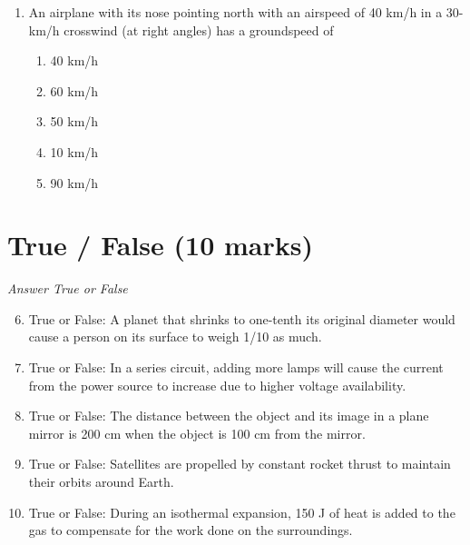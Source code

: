\documentclass[12pt]{article}
\begin{document}
\begin{enumerate}[label=\arabic*.]
\begin{enumerate}[label=(\alph*)]
    \item $97 \mu \mathrm{C}$
    \item $37$$\mu \mathrm{C}$
    \item $77 \mu \mathrm{C}$
    \item $87 \mu \mathrm{C}$
    \item $17 \mu \mathrm{C}$
\end{enumerate}
\item An airplane with its nose pointing north with an airspeed of 40 km/h in a 30-km/h crosswind (at right angles) has a groundspeed of
\begin{enumerate}[label=(\alph*)]
    \item 40 km/h
    \item 60 km/h
    \item 50 km/h
    \item 10 km/h
    \item 90 km/h
\end{enumerate}
\end{enumerate}

\section*{True / False (10 marks)}
\textit{Answer True or False}
\begin{enumerate}[label=\arabic*.]
\setcounter{enumi}{5}
\item True or False: A planet that shrinks to one-tenth its original diameter would cause a person on its surface to weigh 1/10 as much.
\item True or False: In a series circuit, adding more lamps will cause the current from the power source to increase due to higher voltage availability.
\item True or False: The distance between the object and its image in a plane mirror is 200 cm when the object is 100 cm from the mirror.
\item True or False: Satellites are propelled by constant rocket thrust to maintain their orbits around Earth.
\item True or False: During an isothermal expansion, 150 J of heat is added to the gas to compensate for the work done on the surroundings.
\end{enumerate}
\end{document}

